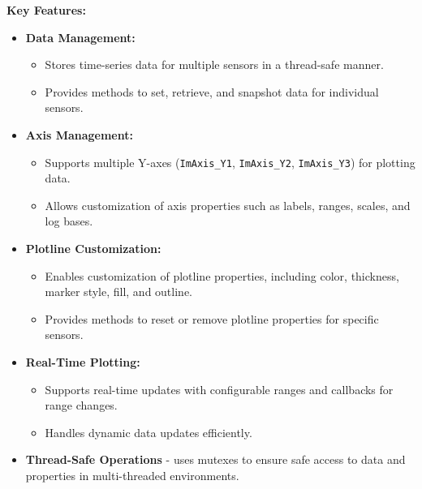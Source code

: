 \documentclass{article}
\begin{document}
\vspace{5pt}
\noindent
\textbf{Key Features:}
\begin{itemize}
    \item \textbf{Data Management:}
    \begin{itemize}
        \item Stores time-series data for multiple sensors in a thread-safe manner.

        \item Provides methods to set, retrieve, and snapshot data for individual sensors.
    \end{itemize}
    
    \item \textbf{Axis Management:}
    \begin{itemize}
        \item Supports multiple Y-axes (\texttt{ImAxis\_Y1}, \texttt{ImAxis\_Y2}, \texttt{ImAxis\_Y3}) for plotting data.

        \item Allows customization of axis properties such as labels, ranges, scales, and log bases.
    \end{itemize}
    
    \item \textbf{Plotline Customization:}
    \begin{itemize}
        \item Enables customization of plotline properties, including color, thickness, marker style, fill, and outline.

        \item Provides methods to reset or remove plotline properties for specific sensors.
    \end{itemize}

    \item \textbf{Real-Time Plotting:}
    \begin{itemize}
        \item Supports real-time updates with configurable ranges and callbacks for range changes.

        \item Handles dynamic data updates efficiently.
    \end{itemize}

    \item \textbf{Thread-Safe Operations} - uses mutexes to ensure safe access to data and properties in multi-threaded environments.
\end{itemize}
\end{document}
